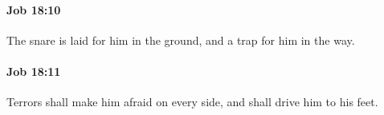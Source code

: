 		\paragraph{Job 18:10} %
			\label{JOB-18-10}

			The snare is laid for him in the ground, and a trap for him in the way.


		\paragraph{Job 18:11} %
			\label{JOB-18-11}

			Terrors shall make him afraid on every side, and shall drive him to his feet.


